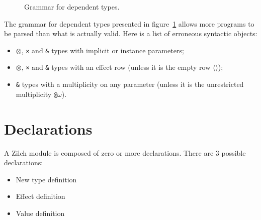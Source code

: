 \begin{figure}[H]
	\centering


	\caption{Grammar for dependent types.}
	\label{fig:zilch-grammar-types-dependent-grammar}
\end{figure}

\begin{warningbox}
	The grammar for dependent types presented in figure~\ref{fig:zilch-grammar-types-dependent-grammar} allows more programs to be parsed than what is actually valid.
	Here is a list of erroneous syntactic objects:
	\begin{itemize}
		\item \texttt{$\otimes$}, \texttt{×} and \texttt{\&} types with implicit or instance parameters;
		\item \texttt{$\otimes$}, \texttt{×} and \texttt{\&} types with an effect row (unless it is the empty row \texttt{$\langle\rangle$});
		\item \texttt{\&} types with a multiplicity on any parameter (unless it is the unrestricted multiplicity \texttt{@$\omega$}).
	\end{itemize}
\end{warningbox}

\section{Declarations}\label{sec:zilch-grammar-declarations}

A Zilch module is composed of zero or more declarations.
There are 3 possible declarations:
\begin{itemize}
	\item New type definition
	\item Effect definition
	\item Value definition
\end{itemize}

